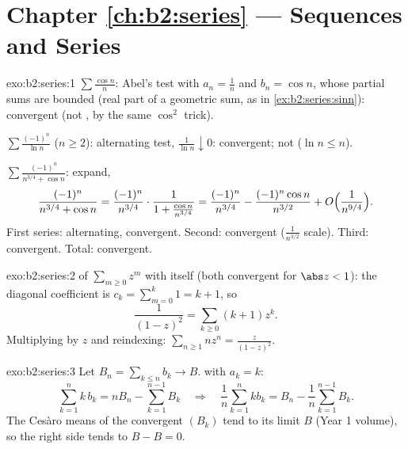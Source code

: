 \section*{Chapter \ref{ch:b2:series} --- Sequences and Series}

\begin{solution}{exo:b2:series:1}
$\sum\frac{\cos n}{n}$: Abel's test with $a_n = \frac1n$ and $b_n =
\cos n$, whose partial sums are bounded (real part of a geometric
sum, as in \cref{ex:b2:series:sinn}): convergent (not ,
by the same $\cos^2$ trick).

$\sum \frac{(-1)^n}{\ln n}$ ($n \geq 2$): alternating test,
$\frac{1}{\ln n} \downarrow 0$: convergent; not  ($\ln n
\leq n$).

$\sum \frac{(-1)^n}{n^{3/4} + \cos n}$: expand,
\[
\frac{(-1)^n}{n^{3/4} + \cos n}
= \frac{(-1)^n}{n^{3/4}}\cdot
\frac{1}{1 + \frac{\cos n}{n^{3/4}}}
= \frac{(-1)^n}{n^{3/4}}
- \frac{(-1)^n\cos n}{n^{3/2}} + O\Bigl(\frac{1}{n^{9/4}}\Bigr).
\]
First series: alternating, convergent. Second: 
convergent ($\frac{1}{n^{3/2}}$ scale). Third: 
convergent. Total: convergent.
\end{solution}

\begin{solution}{exo:b2:series:2}
 of $\sum_{m\geq0} z^m$ with itself (both 
convergent for $\abs z < 1$): the diagonal coefficient is $c_k =
\sum_{m=0}^{k} 1 = k + 1$, so
\[
\frac{1}{(1-z)^2} = \sum_{k\geq0} (k+1)z^k .
\]
Multiplying by $z$ and reindexing: $\sum_{n \geq 1} n z^n =
\frac{z}{(1-z)^2}$.
\end{solution}

\begin{solution}{exo:b2:series:3}
Let $B_n = \sum_{k \leq n} b_k \to B$.  with $a_k = k$:
\[
\sum_{k=1}^{n} k\,b_k = n B_n - \sum_{k=1}^{n-1} B_k
\quad\Longrightarrow\quad
\frac1n \sum_{k=1}^{n} k b_k = B_n - \frac{1}{n}\sum_{k=1}^{n-1}
B_k .
\]
The Ces\`aro means of the convergent $(B_k)$ tend to its limit $B$
(Year 1 volume), so the right side tends to $B - B = 0$.
\end{solution}

